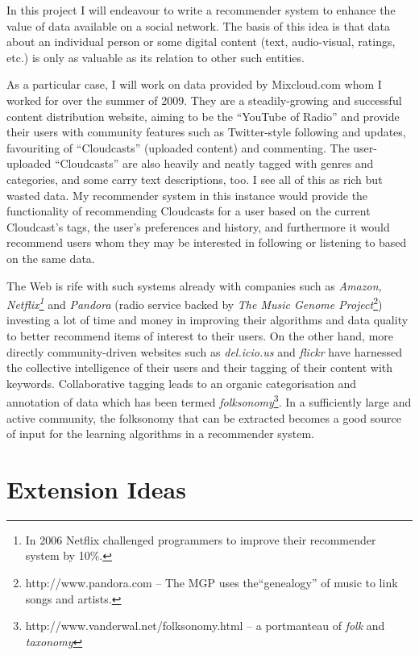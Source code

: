 In this project I will endeavour to write a recommender system to enhance the value of data available on a social network. The basis of this idea is that data about an individual person or some digital content (text, audio-visual, ratings, etc.) is only as valuable as its relation to other such entities. 

As a particular case, I will work on data provided by Mixcloud.com whom I worked for over the summer of 2009. They are a steadily-growing and successful content distribution website, aiming to be the ``YouTube of Radio'' and provide their users with community features such as Twitter-style following and updates, favouriting of ``Cloudcasts'' (uploaded content) and commenting. The user-uploaded ``Cloudcasts'' are also heavily and neatly tagged with genres and categories, and some carry text descriptions, too. I see all of this as rich but wasted data. My recommender system in this instance would provide the functionality of recommending Cloudcasts for a user based on the current Cloudcast's tags, the user's preferences and history, and furthermore it would recommend users whom they may be interested in following or listening to based on the same data.

The Web is rife with such systems already with companies such as \textit{Amazon, Netflix\footnote{In 2006 Netflix challenged programmers to improve their recommender system by 10\%.}} and \textit{Pandora} (radio service backed by \textit{The Music Genome Project}\footnote{http://www.pandora.com -- The MGP uses the``genealogy'' of music to link songs and artists.}) investing a lot of time and money in improving their algorithms and data quality to better recommend items of interest to their users. On the other hand, more directly community-driven websites such as \textit{del.icio.us} and \textit{flickr} have harnessed the collective intelligence of their users and their tagging of their content with keywords. Collaborative tagging leads to an organic categorisation and annotation of data which has been termed \textit{folksonomy}\footnote{http://www.vanderwal.net/folksonomy.html -- a portmanteau of \textit{folk} and \textit{taxonomy} }. In a sufficiently large and active community, the folksonomy that can be extracted becomes a good source of input for the learning algorithms in a recommender system.

\section{Extension Ideas}

